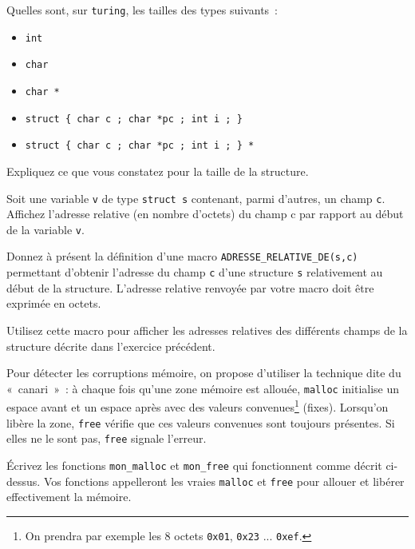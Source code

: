 %



\question

Quelles sont, sur \texttt {turing}, les tailles des types suivants~:
\begin {itemize}
    \item \texttt {int}
    \item \texttt {char}
    \item \texttt {char *}
    \item \verb|struct { char c ; char *pc ; int i ; }|
    \item \verb|struct { char c ; char *pc ; int i ; } *|
\end {itemize}

Expliquez ce que vous constatez pour la taille de la structure.


\question

Soit une variable \texttt {v} de type \texttt {struct s} contenant, parmi
d'autres, un champ \texttt {c}. Affichez l'adresse relative (en nombre
d'octets) du champ {c} par rapport au début de la variable \texttt {v}.

Donnez à présent la définition d'une macro
\verb|ADRESSE_RELATIVE_DE(s,c)| permettant d'obtenir l'adresse du champ
\texttt {c} d'une structure \texttt {s} relativement au début de la
structure. L'adresse relative renvoyée par votre macro doit être
exprimée en octets.

Utilisez cette macro pour afficher les adresses relatives des différents
champs de la structure décrite dans l'exercice précédent.


\question

Pour détecter les corruptions mémoire, on propose d'utiliser la
technique dite du «~canari~»~: à chaque fois qu'une zone mémoire est
allouée, \texttt {malloc} initialise un espace avant et un espace après
avec des valeurs convenues\footnote {On prendra par exemple les 8 octets
\texttt {0x01}, \texttt {0x23} ... \texttt {0xef}.}
(fixes).  Lorsqu'on libère la zone, \texttt {free} vérifie que ces
valeurs convenues sont toujours présentes. Si elles ne le sont pas,
\texttt {free} signale l'erreur.

Écrivez les fonctions \texttt {mon\_malloc} et \texttt {mon\_free}
qui fonctionnent comme décrit ci-dessus. Vos fonctions appelleront
les vraies \texttt {malloc} et \texttt {free} pour allouer et libérer
effectivement la mémoire.


